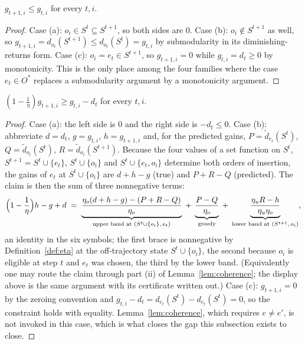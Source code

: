 \begin{lemma}
\label{lem:app-mono}
$g_{t+1,i}\le g_{t,i}$ for every $t,i$.
\end{lemma}
\begin{proof}
Case (a): $o_i\in S^{t}\subseteq S^{t+1}$, so both sides are $0$.
Case (b): $o_i\notin S^{t+1}$ as well, so
$g_{t+1,i}=d_{o_i}(S^{t+1})\le d_{o_i}(S^{t})=g_{t,i}$ by submodularity in its
diminishing-returns form.
Case (c): $o_i=e_t\in S^{t+1}$, so $g_{t+1,i}=0$ while $g_{t,i}=d_t\ge0$ by
monotonicity.  This is the only place among the four families where the case
$e_t\in O^{\ast}$ replaces a submodularity argument by a monotonicity argument.
\end{proof}

\begin{lemma}\label{lem:app-cons}
$(1-\tfrac1\eta)g_{t+1,i}\ge g_{t,i}-d_t$ for every $t,i$.
\end{lemma}
\begin{proof}
Case (a): the left side is $0$ and the right side is $-d_t\le0$.
Case (b): abbreviate $d=d_t$, $g=g_{t,i}$, $h=g_{t+1,i}$ and, for the
predicted gains, $P=\tilde d_{e_t}(S^{t})$, $Q=\tilde d_{o_i}(S^{t})$,
$R=\tilde d_{o_i}(S^{t+1})$.  Because the four values of a set function on
$S^{t}$, $S^{t+1}=S^{t}\cup\{e_t\}$, $S^{t}\cup\{o_i\}$ and
$S^{t}\cup\{e_t,o_i\}$ determine both orders of insertion, the gains of
$e_t$ at $S^{t}\cup\{o_i\}$ are $d+h-g$ (true) and $P+R-Q$ (predicted).
The claim is then the sum of three nonnegative terms:
\[
  \Bigl(1-\frac1\eta\Bigr)h-g+d
  \;=\;\underbrace{\frac{\eta_o(d+h-g)-(P+R-Q)}{\eta_o}}_{\text{upper band
  at }(S^{t}\cup\{o_i\},\,e_t)}
  \;+\;\underbrace{\frac{P-Q}{\eta_o}}_{\text{greedy}}
  \;+\;\underbrace{\frac{\eta_uR-h}{\eta_u\eta_o}}_{\text{lower band at
  }(S^{t+1},\,o_i)} ,
\]
an identity in the six symbols; the first brace is nonnegative by
Definition~\ref{def:eta} at the off-trajectory state $S^{t}\cup\{o_i\}$, the
second because $o_i$ is eligible at step $t$ and $e_t$ was chosen, the third
by the lower band.  (Equivalently one may route the claim through part (ii)
of Lemma~\ref{lem:coherence}; the display above is the same argument with
its certificate written out.)
Case (c): $g_{t+1,i}=0$ by the zeroing convention and
$g_{t,i}-d_t=d_{e_t}(S^{t})-d_{e_t}(S^{t})=0$, so the constraint holds with
equality.  Lemma~\ref{lem:coherence}, which requires $e\ne e'$, is not invoked
in this case, which is what closes the gap this subsection exists to close.
\end{proof}

